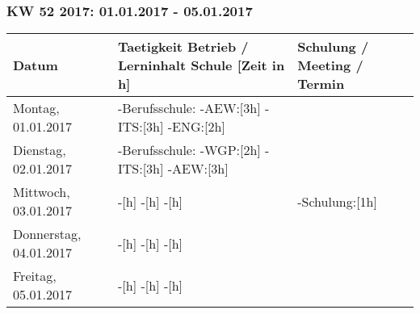 \documentclass{pfdoc}
\begin{document}
\subsubsection{KW 52 2017: 01.01.2017 - 05.01.2017}
\begin{tabular}{|L{2cm}|L{10cm}|L{5cm}|}
\hline
\textbf{Datum} & \textbf{Taetigkeit Betrieb / Lerninhalt Schule [Zeit in h]} & \textbf{Schulung / Meeting / Termin} \\
\hline
Montag, 01.01.2017
&
-Berufsschule: \linebreak
-AEW:[3h] \linebreak
-ITS:[3h] \linebreak
-ENG:[2h] \linebreak
&
\\
\hline
Dienstag, 02.01.2017
&
-Berufsschule: \linebreak
-WGP:[2h] \linebreak
-ITS:[3h] \linebreak
-AEW:[3h] \linebreak
&
\\
\hline
Mittwoch, 03.01.2017
&
-[h] \linebreak
-[h] \linebreak
-[h] \linebreak
&
-Schulung:[1h] \linebreak
\\
\hline
Donnerstag, 04.01.2017
&
-[h] \linebreak
-[h] \linebreak
-[h] \linebreak
&
\\
\hline
Freitag, 05.01.2017
&
-[h] \linebreak
-[h] \linebreak
-[h] \linebreak
&
\\
\hline
\end{tabular}
\vfill
{}
\end{document}
